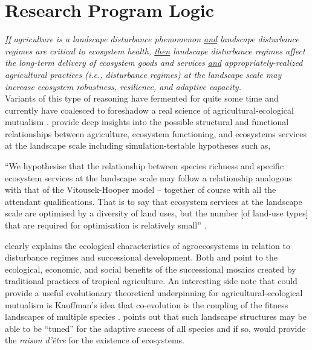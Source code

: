 \section{Research Program Logic}
\textit{\underline{If} agriculture is a landscape disturbance phenomenon \underline{and} landscape disturbance regimes are critical to ecosystem health, \underline{then} landscape disturbance regimes affect the long-term delivery of ecosystem goods and services \underline{and} appropriately-realized agricultural practices (i.e., disturbance regimes) at the landscape scale may increase ecosystem robustness, resilience, and adaptive capacity.}\\

Variants of this type of reasoning have fermented for quite some time and currently have coalesced to foreshadow a real science of agricultural-ecological mutualism \citep{swift_biodiversity_2004, gliessman_agroecology:_2015}. \citet{swift_biodiversity_2004} provide deep insights into the possible structural and functional relationships between agriculture, ecosystem functioning, and ecosystems services at the landscape scale including simulation-testable hypotheses such as,
\begin{myindentpar}{2em}
\enquote{We hypothesise that the relationship between species richness and specific ecosystem services at the landscape scale may follow a relationship analogous with that of the Vitousek-Hooper model -- together of course with all the attendant qualifications. That is to say that ecosystem services at the landscape scale are optimised by a diversity of land uses, but the number [of land-use types] that are required for optimisation is relatively small} \citep{swift_biodiversity_2004}.
\end{myindentpar}
\citet{gliessman_agroecology:_2015} clearly explains the ecological characteristics of agroecosystems in relation to disturbance regimes and successional development.  Both \citet{swift_biodiversity_2004} and \citet{gliessman_agroecology:_2015} point to the ecological, economic, and social benefits of the successional mosaics created by traditional practices of tropical agriculture. An interesting side note that could provide a useful evolutionary theoretical underpinning for agricultural-ecological mutualism is Kauffman's idea that co-evolution is the coupling of the fitness landscapes of multiple species \citep{kauffman_origins_1993}. \citet{kauffman_origins_1993} points out that such landscape structures may be able to be \enquote{tuned} for the adaptive success of all species and if so, would provide the \textit{raison d'\^{e}tre} for the existence of ecosystems.\\

